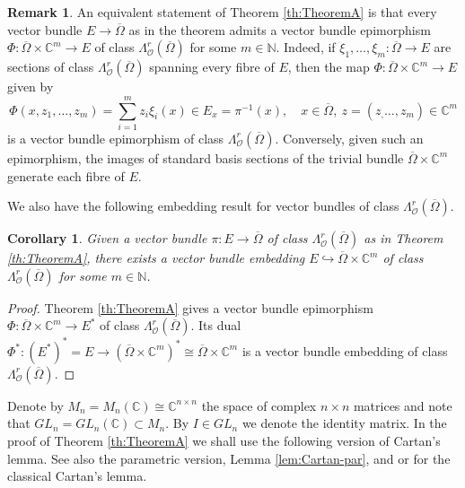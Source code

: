\documentclass[11pt]{amsart}
\numberwithin{equation}{section}
\newtheorem{corollary}[theorem]{Corollary}
\theoremstyle{definition}
\newtheorem{remark}[theorem]{Remark}
\newcommand\Oscr{\mathscr{O}}
\newcommand\C{\mathbb{C}}
\newcommand\N{\mathbb{N}}
\begin{document}
\begin{remark}\label{rem:TheoremA}
An equivalent statement of Theorem \ref{th:TheoremA} 
is that every vector bundle $E\to \overline \Omega$ as in 
the theorem admits a vector bundle epimorphism
$\Phi:\overline\Omega\times \C^m \to E$ of class
$\Lambda^r_\Oscr(\overline\Omega)$ for some $m\in\N$.
Indeed, if $\xi_1,\ldots,\xi_m:\overline\Omega\to E$
are sections of class $\Lambda^r_\Oscr(\overline\Omega)$ 
spanning every fibre of $E$, then the map 
$\Phi:\overline\Omega\times \C^m \to E$ given by 
\begin{equation}\label{eq:Phi}
	\Phi(x,z_1,\ldots,z_m)= \sum_{i=1}^m z_i\xi_i(x) \in E_x=\pi^{-1}(x),
	\quad x\in\overline\Omega,\ z=(z_,\ldots,z_m)\in\C^m
\end{equation}
is a vector bundle epimorphism of class 
$\Lambda^r_\Oscr(\overline\Omega)$. Conversely,
given such an epimorphism, the images of standard basis sections
of the trivial bundle $\overline\Omega\times \C^m$ generate each fibre of $E$. 
\end{remark}


We also have the following embedding result for vector bundles
of class $\Lambda^r_\Oscr(\overline\Omega)$. 

\begin{corollary}\label{cor:embedding}
Given a vector bundle $\pi:E\to \overline \Omega$ of class
$\Lambda^r_\Oscr(\overline\Omega)$ as in Theorem \ref{th:TheoremA},
there exists a vector bundle embedding
$E\hookrightarrow \overline \Omega\times \C^m$ of class
$\Lambda^r_\Oscr(\overline\Omega)$ for some $m\in\N$.
\end{corollary}

\begin{proof}
Theorem \ref{th:TheoremA} gives a vector bundle epimorphism
$\Phi: \overline \Omega \times \C^m \to E^*$ of class
$\Lambda^r_\Oscr(\overline\Omega)$. Its dual $\Phi^*:(E^*)^*=E \to 
(\overline \Omega \times \C^m)^* \cong \overline \Omega \times \C^m$
is a vector bundle embedding of class 
$\Lambda^r_\Oscr(\overline\Omega)$.
\end{proof}

Denote by $M_n=M_n(\C)\cong \C^{n\times n}$ 
the space of complex $n\times n$ matrices
and note that $GL_n=GL_n(\C)\subset M_n$. 
By $I\in GL_n$ we denote the identity matrix. 
In the proof of Theorem \ref{th:TheoremA} we shall use the following
version of Cartan's lemma. See also the parametric version,
Lemma \ref{lem:Cartan-par}, and \cite{Cartan1940}
or \cite[Section VI.\ E]{GunningRossi1965} for the classical 
Cartan's lemma.
\end{document}
